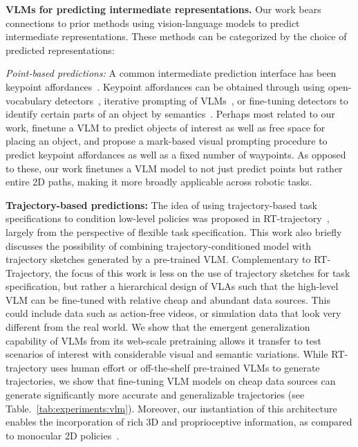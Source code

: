 \textbf{VLMs for predicting intermediate representations.}
Our work bears connections to prior methods using vision-language models to predict intermediate representations. These methods can be categorized by the choice of predicted representations:


\emph{Point-based predictions:} A common intermediate prediction interface has been keypoint affordances~\citep{stone2023open,sundaresan2023kite,nasiriany2024pivot,yuan2024robopoint,kuang2024ram}. Keypoint affordances can be obtained through using open-vocabulary detectors~\citep{minderer2022simple}, iterative prompting of VLMs~\citep{nasiriany2024pivot}, or fine-tuning detectors to identify certain parts of an object by semantics~\citep{sundaresan2023kite}. Perhaps most related to our work, \cite{yuan2024robopoint} finetune a VLM to predict objects of interest as well as free space for placing an object, and \cite{liu2024moka} propose a mark-based visual prompting procedure to predict keypoint affordances as well as a fixed number of waypoints. As opposed to these, our work finetunes a VLM model to not just predict points but rather entire 2D paths, making it more broadly applicable across robotic tasks. %

\textbf{Trajectory-based predictions:} The idea of using trajectory-based task specifications to condition low-level policies was proposed in RT-trajectory~\citep{gu2023rttrajectory}, largely from the perspective of flexible task specification. This work also briefly discusses the possibility of combining trajectory-conditioned model with trajectory sketches generated by a pre-trained VLM. Complementary to RT-Trajectory, the focus of this work is less on the use of trajectory sketches for task specification, but rather a hierarchical design of VLAs such that the high-level VLM can be fine-tuned with relative cheap and abundant data sources. This could include data such as action-free videos, or simulation data that look very different from the real world. We show that the emergent generalization capability of VLMs from its web-scale pretraining allows it transfer to test scenarios of interest with considerable visual and semantic variations.  While RT-trajectory uses human effort or off-the-shelf pre-trained VLMs to generate trajectories, we show that fine-tuning VLM models on cheap data sources can generate significantly more accurate and generalizable trajectories (see Table.~\ref{tab:experiments:vlm}).  Moreover, our instantiation of this architecture enables the incorporation of rich 3D and proprioceptive information, as compared to monocular 2D policies~\citep{gu2023rttrajectory}. 

